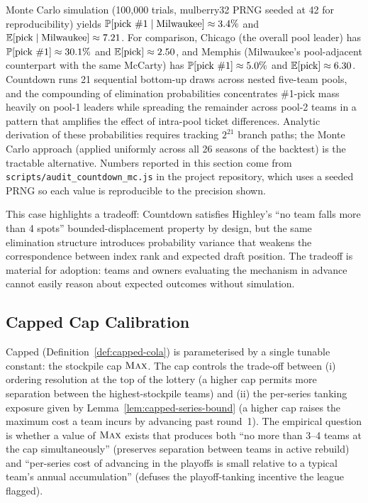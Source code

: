 Monte Carlo simulation (100{,}000 trials, mulberry32 PRNG seeded at 42 for reproducibility) yields $\mathbb{P}[\text{pick } \#1 \mid \text{Milwaukee}] \approx 3.4\%$ and $\mathbb{E}[\text{pick} \mid \text{Milwaukee}] \approx 7.21$. For comparison, Chicago (the overall pool leader) has $\mathbb{P}[\text{pick } \#1] \approx 30.1\%$ and $\mathbb{E}[\text{pick}] \approx 2.50$, and Memphis (Milwaukee's pool-adjacent counterpart with the same McCarty) has $\mathbb{P}[\text{pick } \#1] \approx 5.0\%$ and $\mathbb{E}[\text{pick}] \approx 6.30$. Countdown \cola{} runs 21 sequential bottom-up draws across nested five-team pools, and the compounding of elimination probabilities concentrates \#1-pick mass heavily on pool-1 leaders while spreading the remainder across pool-2 teams in a pattern that amplifies the effect of intra-pool ticket differences. Analytic derivation of these probabilities requires tracking $2^{21}$ branch paths; the Monte Carlo approach (applied uniformly across all 26 seasons of the backtest) is the tractable alternative. Numbers reported in this section come from \texttt{scripts/audit\_countdown\_mc.js} in the project repository, which uses a seeded PRNG so each value is reproducible to the precision shown.

This case highlights a tradeoff: Countdown \cola{} satisfies Highley's ``no team falls more than 4 spots'' bounded-displacement property by design, but the same elimination structure introduces probability variance that weakens the correspondence between \cola{} index rank and expected draft position. The tradeoff is material for adoption: teams and owners evaluating the mechanism in advance cannot easily reason about expected outcomes without simulation.

\subsection{Capped \cola{} Cap Calibration}
\label{sec:case-cap-sweep}

Capped \cola{} (Definition~\ref{def:capped-cola}) is parameterised by a single tunable constant: the stockpile cap $\textup{\textsc{Max}}$. The cap controls the trade-off between (i) ordering resolution at the top of the lottery (a higher cap permits more separation between the highest-stockpile teams) and (ii) the per-series tanking exposure given by Lemma~\ref{lem:capped-series-bound} (a higher cap raises the maximum cost a team incurs by advancing past round~1). The empirical question is whether a value of $\textup{\textsc{Max}}$ exists that produces both ``no more than 3--4 teams at the cap simultaneously'' (preserves separation between teams in active rebuild) and ``per-series cost of advancing in the playoffs is small relative to a typical team's annual accumulation'' (defuses the playoff-tanking incentive the league flagged).

